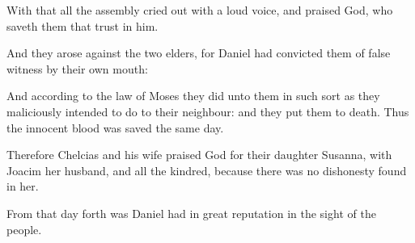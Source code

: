 {\par }{\PP {}With that all the assembly cried out with a loud voice, and praised God, who saveth them that trust in him.
\par }{\PP {}And they arose against the two elders, for Daniel had convicted them of false witness by their own mouth:
\par }{\PP {}And according to the law of Moses they did unto them in such sort as they maliciously intended to do to their neighbour: and they put them to death. Thus the innocent blood was saved the same day.
\par }{\PP {}Therefore Chelcias and his wife praised God for their daughter Susanna, with Joacim her husband, and all the kindred, because there was no dishonesty found in her.
\par }{\PP {}From that day forth was Daniel had in great reputation in the sight of the people.
\par }